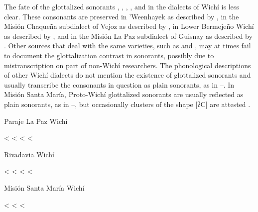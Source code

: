 The fate of the glottalized sonorants , , , , and  in the dialects of Wichí is less clear. These consonants are preserved in ’Weenhayek as described by \citet{KC94,KC16}, in the Misión Chaqueña subdialect of Vejoz as described by \citet{MG-MELO15}, in Lower Bermejeño Wichí as described by \citet{VN14}, and in the Misión La Paz subdialect of Guisnay as described by \citet{MA08}. Other sources that deal with the same varieties, such as \citet{VU74} and \citet{JB09}, may at times fail to document the glottalization contrast in sonorants, possibly due to mistranscription on part of non-Wichí researchers. The phonological descriptions of other Wichí dialects do not mention the existence of glottalized sonorants and usually transcribe the consonants in question as plain sonorants, as in –. In Misión Santa María, Proto-Wichí glottalized sonorants are usually reflected as plain sonorants, as in –, but occasionally clusters of the shape [ʔC] are attested .

\ea
Paraje La Paz Wichí \citep{AFG067} \label{wi-plp-degs}\\
    \begin{xlist}
        \ex {} < 
        \ex {} < 
        \ex {} < 
        \ex {} < 
    \end{xlist}
\z
\ea
Rivadavia Wichí \citep[68, 146, 157, 220]{JT09-th} \label{wi-riv-degs}\\
    \begin{xlist}
        \ex {} < 
        \ex {} < 
        \ex {} < 
        \ex {} < 
    \end{xlist}
\z
\ea
Misión Santa María Wichí \citep{SS07}\\
    \begin{xlist}
        \ex {} <  \label{msm-tree}
        \ex {} < \label{msm-blood}
        \ex {} < \label{msm-man}
    \end{xlist}
\z
{}

